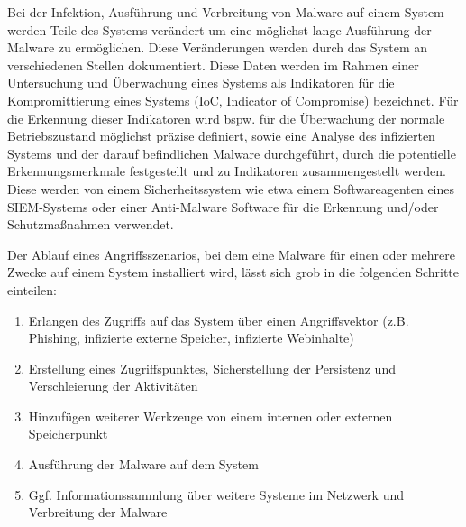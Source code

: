 Bei der Infektion, Ausführung und Verbreitung von Malware auf einem System werden Teile des Systems verändert um eine möglichst lange Ausführung der Malware zu ermöglichen. Diese Veränderungen werden durch das System an verschiedenen Stellen dokumentiert. Diese Daten werden im Rahmen einer Untersuchung und Überwachung eines Systems als Indikatoren für die Kompromittierung eines Systems (IoC, \glqq Indicator of Compromise\grqq ) bezeichnet. Für die Erkennung dieser Indikatoren wird bspw. für die Überwachung der normale Betriebszustand möglichst präzise definiert, sowie eine Analyse des infizierten Systems und der darauf befindlichen Malware durchgeführt, durch die potentielle Erkennungsmerkmale festgestellt und zu Indikatoren zusammengestellt werden. Diese werden von einem Sicherheitssystem wie etwa einem Softwareagenten eines SIEM-Systems oder einer Anti-Malware Software für die Erkennung und/oder Schutzmaßnahmen verwendet.

Der Ablauf eines Angriffsszenarios, bei dem eine Malware für einen oder mehrere Zwecke auf einem System installiert wird, lässt sich grob in die folgenden Schritte einteilen:
\begin{enumerate}
\item Erlangen des Zugriffs auf das System über einen Angriffsvektor (z.B. Phishing, infizierte externe Speicher, infizierte Webinhalte)
\item Erstellung eines Zugriffspunktes, Sicherstellung der Persistenz und Verschleierung der Aktivitäten
\item Hinzufügen weiterer Werkzeuge von einem internen oder externen Speicherpunkt
\item Ausführung der Malware auf dem System
\item Ggf. Informationssammlung über weitere Systeme im Netzwerk und Verbreitung der Malware
\end{enumerate}


